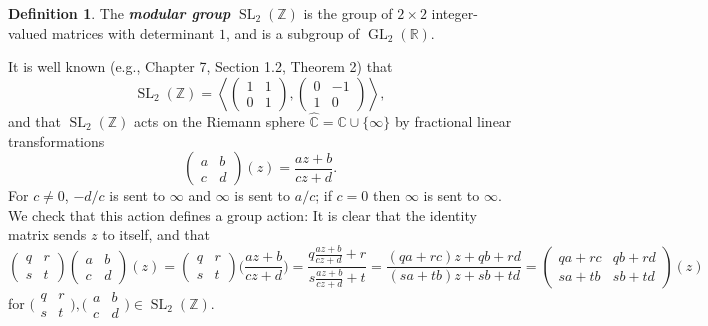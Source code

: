 \documentclass[10pt,leqno,twoside]{article}
\theoremstyle{plain}
\theoremstyle{definition}
\newtheorem{definition/}[lem]{Definition}
\newenvironment{definition}
  {\renewcommand{\qedsymbol}{\textdagger}%
   \pushQED{\qed}\begin{definition/}}
  {\popQED\end{definition/}}
\numberwithin{equation}{section}
\numberwithin{lem}{section}
\newcommand{\textib}[1]{\textbf{\textit{#1\index{#1}}}} %
\DeclareMathOperator{\GL}{GL}
\DeclareMathOperator{\SL}{SL}
\newcommand{\abcd}{\begin{pmatrix}
    a & b \\ c & d
\end{pmatrix}}
\newcommand{\slz}{\SL_2(\mathbb{Z})}
\begin{document}
\begin{definition}
    The \textib{modular group} $\slz$ is the group of $2\times 2$ integer-valued matrices with determinant $1$, and is a subgroup of $\GL_2(\mathbb{R})$.
\end{definition} 
It is well known (e.g., \cite{serre} Chapter 7, Section 1.2, Theorem 2) that 
\begin{equation}\label{eq: generators modular group}
    \slz = \left\langle\begin{pmatrix}
        1 & 1 \\ 0 & 1
    \end{pmatrix}, \begin{pmatrix}
        0 & -1 \\ 1 & 0
    \end{pmatrix}\right\rangle, 
\end{equation}
and that $\slz$ acts on the Riemann sphere $\widehat{\mathbb{C}} = \mathbb{C}\cup \{\infty\}$ by fractional linear transformations
\[\abcd(z) = \frac{az + b}{cz + d}.\] For $c\neq 0$, $-d/c$ is sent to $\infty$ and $\infty$ is sent to $a/c$; if $c = 0$ then $\infty$ is sent to $\infty$. We check that this action defines a group action: It is clear that the identity matrix sends $z$ to itself, and that 
\[\begin{pmatrix}
    q & r \\ s & t
\end{pmatrix}\abcd(z) = \begin{pmatrix}
    q & r \\ s & t
\end{pmatrix}\Big(\frac{az+b}{cz+d}\Big) = \frac{q\frac{az+b}{cz+d}+r}{s\frac{az+b}{cz+d}+t} = \frac{(qa+rc)z+qb+rd}{(sa+tb)z+sb+td} = \begin{pmatrix}
    qa+rc & qb+rd \\ sa+tb & sb+td
\end{pmatrix}(z)\] for $\big(\!\begin{smallmatrix}
    q & r \\ s & t
\end{smallmatrix}\!\big),\big(\!\begin{smallmatrix}
    a & b \\ c & d
\end{smallmatrix}\!\big)\in \slz$.
\end{document}
